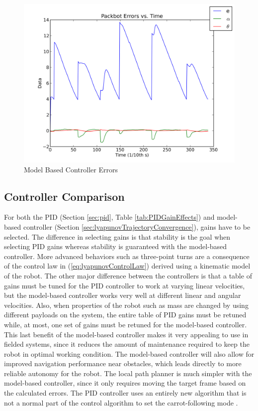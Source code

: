 \begin{figure}[ht!]
	\centering
	\includegraphics[width=.5\textwidth]{images/pbtx/20110113_1451_pbtx_simpleDriveErrors}
	\caption{Model Based Controller Errors}
	\label{fig:mbErrors}
\end{figure}

\subsection{Controller Comparison}
\label{sec:controllerComparison}
For both the PID (Section \ref{sec:pid}, Table \ref{tab:PIDGainEffects}) and model-based controller (Section \ref{sec:lyapunovTrajectoryConvergence}), gains have to be selected. The difference in selecting gains is that stability is the goal when selecting PID gains whereas stability is guaranteed with the model-based controller. More advanced behaviors such as three-point turns are a consequence of the control law in (\ref{eq:lyapunovControlLaw}) derived using a kinematic model of the robot. The other major difference between the controllers is that a table of gains must be tuned for the PID controller to work at varying linear velocities, but the model-based controller works very well at different linear and angular velocities. Also, when properties of the robot such as mass are changed by using different payloads on the system, the entire table of PID gains must be retuned while, at most, one set of gains must be retuned for the model-based controller. This last benefit of the model-based controller makes it very appealing to use in fielded systems, since it reduces the amount of maintenance required to keep the robot in optimal working condition. The model-based controller will also allow for improved navigation performance near obstacles, which leads directly to more reliable autonomy for the robot. The local path planner is much simpler with the model-based controller, since it only requires moving the target frame based on the calculated errors. The PID controller uses an entirely new algorithm that is not a normal part of the control algorithm to set the carrot-following mode \cite{Hogg02}.

